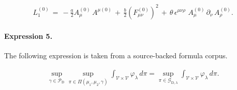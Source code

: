 \documentclass[11pt]{article}
\begin{document}
\begin{align*}L_{1}^{\left( 0\right) }\,=\,-\frac{a}{2}A_{\mu }^{\left( 0\right) }\,A^{\mu\left( 0\right) }\,+\,\frac{b}{2}\left( F_{\mu \nu }^{\left( 0\right)}\right) ^{2}\,+\,\theta \,\epsilon ^{\mu \nu \rho }\,\,A_{\mu }^{\left(0\right) }\,\partial _{\nu }\,A_{\rho }^{\left( 0\right) }. \end{align*}

\paragraph{Expression 5.} The following expression is taken from a source-backed formula corpus.

\begin{align*}\sup _{\gamma \in \mathcal{P}_{\mathrm{D}} } \sup _{\pi \in \Pi\left(\mu_1, \mu_2, \gamma\right)} \int_{\mathcal{V} \times \mathcal{V}} \varphi_\lambda \, d \pi = \sup_{\pi \in \mathcal{G}_{\mathrm{D}, \lambda} } \int_{\mathcal{V} \times \mathcal{V} } \varphi_\lambda \, d \pi.\end{align*}
\end{document}
